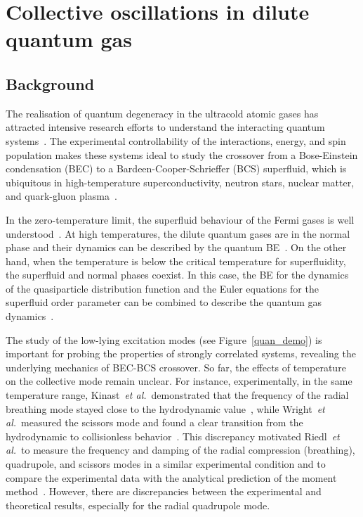 \chapter{Collective oscillations in dilute quantum gas}
\label{chap:oscillation}


\section{Background}

The realisation of quantum degeneracy in the ultracold atomic gases has attracted intensive research efforts to understand the interacting quantum systems~\cite{RMP1,RMP2}. The experimental controllability of the interactions, energy, and spin population makes these systems ideal to study the crossover from a Bose-Einstein condensation (BEC) to a Bardeen-Cooper-Schrieffer (BCS) superfluid, which is ubiquitous in high-temperature superconductivity, neutron stars, nuclear matter, and quark-gluon plasma~\cite{Cao2011}. 

In the zero-temperature limit, the superfluid behaviour of the Fermi gases is well understood~\cite{RMP2,Menotti2002,Cozzini2003}. At high temperatures, the dilute quantum gases are in the normal phase and their dynamics can be described by the quantum BE~\cite{Uehling1933}. On the other hand, when the temperature is below the critical temperature for superfluidity, the superfluid and normal phases coexist. In this case, the BE for the dynamics of the quasiparticle distribution function and the Euler equations for the superfluid order parameter can be combined to describe the quantum gas dynamics~\cite{Jackson2002,Urban2006}. 


The study of the low-lying excitation modes (see Figure~\ref{quan_demo}) is important for probing the properties of strongly correlated systems, revealing the underlying mechanics of BEC-BCS crossover. So far, the effects of temperature on the collective mode remain unclear. For instance, experimentally, in the same temperature range, Kinast~\textit{et al.}~demonstrated  that the frequency of the radial breathing mode stayed close to the hydrodynamic value~\cite{Kinast2005}, while Wright~\textit{et al.}~measured the scissors mode and found a clear transition from the hydrodynamic to collisionless behavior~\cite{Wright2007}. This discrepancy motivated Riedl~\textit{et al.}~to measure the frequency and damping of the radial compression (breathing), quadrupole, and scissors modes in a similar experimental condition and to compare the experimental data with the analytical prediction of the moment method~\cite{Riedl2008}. However, there are discrepancies between the experimental and theoretical results, especially for the radial quadrupole mode.


